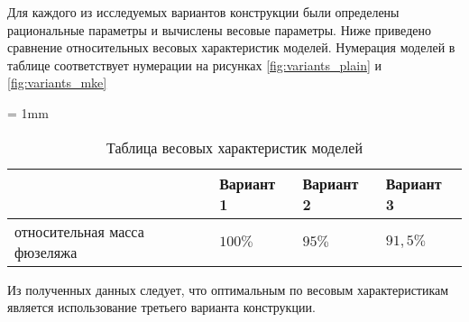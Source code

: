 Для каждого из исследуемых вариантов конструкции были определены рациональные параметры и вычислены весовые параметры. Ниже приведено сравнение относительных весовых характеристик моделей. Нумерация моделей в таблице соответствует нумерации на рисунках \ref{fig:variants_plain} и \ref{fig:variants_mke}

\tabulinesep = 1mm
\begin{table}[H]
\captionsetup{justification=centering}
\caption{Таблица весовых характеристик моделей}
\begin{tabu}to 
\hline
{}
 & Вариант 1 & Вариант 2 & Вариант 3 \\ \hline
относительная масса фюзеляжа & $100\%$ & $95\%$ & $91,5\%$ \\ \hline
\end{tabu}
\label{tab:variantsMasses}
\end{table}

Из полученных данных следует, что оптимальным по весовым характеристикам является использование третьего варианта конструкции.  

